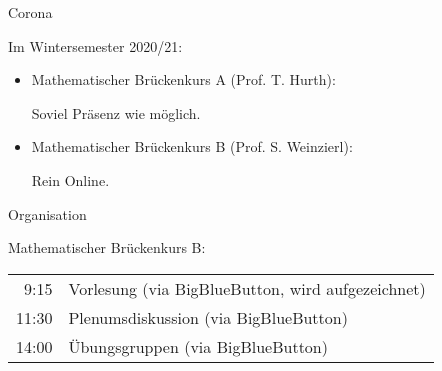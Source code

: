 \documentclass[german]{beamer}
\begin{document}
\begin{frame}{Corona}

Im Wintersemester 2020/21:

\begin{itemize}
\item Mathematischer Br\"uckenkurs A (Prof. T. Hurth):

\alert{Soviel Pr\"asenz wie m\"oglich}.

\item Mathematischer Br\"uckenkurs B (Prof. S. Weinzierl):

\alert{Rein Online}.

\end{itemize}
\end{frame}

\begin{frame}{Organisation}

Mathematischer Br\"uckenkurs B:

\vspace*{5mm}

\begin{tabular}{rl}
 9:15 & Vorlesung (via BigBlueButton, wird aufgezeichnet) \\
 11:30 & Plenumsdiskussion (via BigBlueButton) \\
 14:00 & \"Ubungsgruppen (via BigBlueButton) \\
\end{tabular}

\end{frame}
\end{document}
